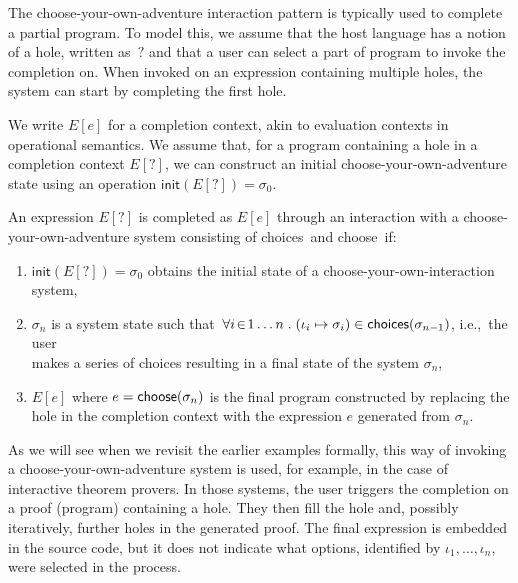 \documentclass[anonymous, a4paper,UKenglish,cleveref, autoref, thm-restate]{lipics-v2021}
\newcommand{\ident}[1]{\textsf{#1}}
\newcommand{\sigmaN}{\sigma_0}
\newcommand{\select}{\textnormal{\ident{choose}}}
\newcommand{\choices}{\textnormal{\ident{choices}}}
\begin{document}
The choose-your-own-adventure interaction pattern is typically used to complete a partial program.
To model this, we assume that the host language has a notion of a hole, written as~$?$
and that a user can select a part of program to invoke the completion on. When invoked on
an expression containing multiple holes, the system can start by completing the first hole.

We write $E[e]$ for a completion context, akin to evaluation contexts in operational semantics.
We assume that, for a program containing a hole in a completion context $E[?]$, we can construct
an initial choose-your-own-adventure state using an operation $\ident{init}(E[?])=\sigmaN$.

\begin{definition}
An expression $E[?]$ is completed as $E[e]$ through an interaction with
a choose-your-own-adventure system consisting of \choices\ and \select\ if:

\vspace{-0.5em}
\raggedright
\begin{enumerate}
\item $\ident{init}(E[?]) = \sigmaN$ obtains the initial state of a choose-your-own-interaction system,
\item $\sigma_n$ is a system state such that $\,\forall i\!\in\! 1\ldots n\;.\;(\iota_i\mapsto\sigma_i)\in\choices{(\sigma_{n-1})}$,
  i.e.,~the user\\ makes a series of choices resulting in a final state of the system $\sigma_n$,
\item $E[e]$ where $e=\select(\sigma_n)$ is the final program constructed by replacing the hole
  in the completion context with the expression $e$ generated from $\sigma_n$.
\end{enumerate}
\end{definition}

As we will see when we revisit the earlier examples formally, this way of invoking a choose-your-own-adventure
system is used, for example, in the case of interactive theorem provers.
In those systems, the user triggers the completion on a proof (program) containing a hole.
They then fill the hole and, possibly iteratively, further holes in the generated proof. The final
expression is embedded in the source code, but it does not indicate what options, identified by
$\iota_1, \ldots, \iota_n$, were selected in the process.

\end{document}
